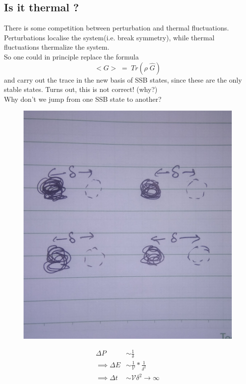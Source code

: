 \documentclass[12pt]{article}
\begin{document}
\newpage
\subsection{Is it thermal ?}
There is some competition between perturbation and thermal fluctuations.\\
Perturbations localise the system(i.e. break symmetry), while thermal fluctuations thermalize the system.\\
So one could in principle replace the formula 
\begin{equation*}
    <G>\;=\;Tr(\rho \;\hat{G})
\end{equation*}
and carry out the trace in the new basis of SSB states, since these are the only stable states. Turns out, this is not correct! (why?)\\
\newline
Why don't we jump from one SSB state to another?\\

\begin{figure}[h]
\centering
\includegraphics[scale=0.1]{IMG_20200722_230039.jpg}
\end{figure}

\begin{align*}
    \Delta P &\sim \frac{1}{\delta}\\
    \implies \Delta E &\sim \frac{1}{\mathcal{V}}*\frac{1}{\delta^2}\\
    \implies \Delta t &\sim \mathcal{V}\delta^2 \to\infty
\end{align*}
\end{document}
